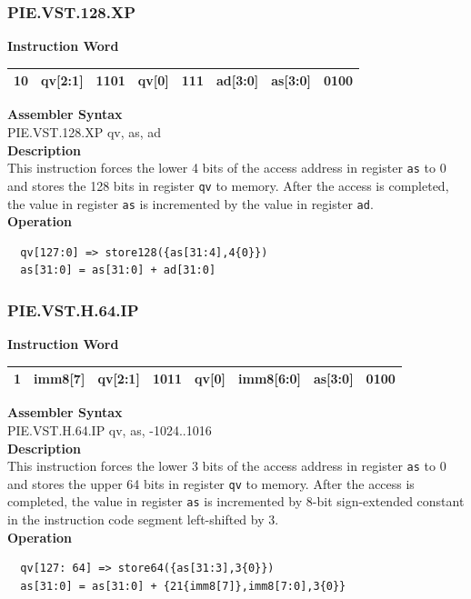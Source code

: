 \newpage
\subsubsection{PIE.VST.128.XP}\label{instruction:PIEVST128XP}
\setlength\tabcolsep{6pt}
\textbf{Instruction Word} \\
\begin{tabular}{|c|c|c|c|c|c|c|c|}
	\hline
	10 & qv[2:1] & 1101 & qv[0] & 111 & ad[3:0] & as[3:0] & 0100 \\
	\hline
\end{tabular}

\textbf{Assembler Syntax} \\
PIE.VST.128.XP qv, as, ad \\
\textbf{Description} \\
This instruction forces the lower 4 bits of the access address in register \lstinline{as} to 0 and stores the 128 bits in register \lstinline{qv} to memory. After the access is completed, the value in register \lstinline{as} is incremented by the value in register \lstinline{ad}.\\
\textbf{Operation}
\begin{lstlisting}
  qv[127:0] => store128({as[31:4],4{0}})
  as[31:0] = as[31:0] + ad[31:0]
\end{lstlisting}

\newpage
\subsubsection{PIE.VST.H.64.IP}\label{instruction:PIEVSTH64IP}
\setlength\tabcolsep{6pt}
\textbf{Instruction Word} \\
\begin{tabular}{|c|c|c|c|c|c|c|c|}
	\hline
	1 & imm8[7] & qv[2:1] & 1011 & qv[0] & imm8[6:0] & as[3:0] & 0100 \\
	\hline
\end{tabular}

\textbf{Assembler Syntax} \\
PIE.VST.H.64.IP qv, as, -1024..1016 \\
\textbf{Description} \\
This instruction forces the lower 3 bits of the access address in register \lstinline{as} to 0 and stores the upper 64 bits in register \lstinline{qv} to memory. After the access is completed, the value in register \lstinline{as} is incremented by 8-bit sign-extended constant in the instruction code segment left-shifted by 3.\\
\textbf{Operation}
\begin{lstlisting}
  qv[127: 64] => store64({as[31:3],3{0}})
  as[31:0] = as[31:0] + {21{imm8[7]},imm8[7:0],3{0}}
\end{lstlisting}


